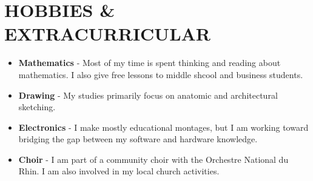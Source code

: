 \documentclass[letterpaper,11pt]{article}
\newcommand{\resumeItem}[1]{
	\item\small{
		{#1 \vspace{-1pt}}
	}
}
\newcommand{\resumeItemListStart}{\begin{itemize}[leftmargin=0.1in]}
\newcommand{\resumeItemListEnd}{\end{itemize}\vspace{-5pt}}
\begin{document}
	\section{\color{BrickRed}HOBBIES \& EXTRACURRICULAR}
    
	\resumeItemListStart
	\vspace{0.5pt}
	
	\resumeItem{\normalsize{\textbf{Mathematics} - Most of my time is spent thinking and reading about mathematics. I also give free lessons to middle shcool and business students.}}
	\vspace{0pt}
	
	\resumeItem{\normalsize{\textbf{Drawing} - My studies primarily focus on anatomic and architectural sketching.}}
    \vspace{0pt}

    \resumeItem{\normalsize{\textbf{Electronics} - I make mostly educational montages, but I am working toward bridging the gap between my software and hardware knowledge.}}
    \vspace{0pt}

    \resumeItem{\normalsize{\textbf{Choir} - I am part of a community choir with the Orchestre National du Rhin. I am also involved in my local church activities.}}
    \vspace{0pt}
	
	\resumeItemListEnd
	
\end{document}
